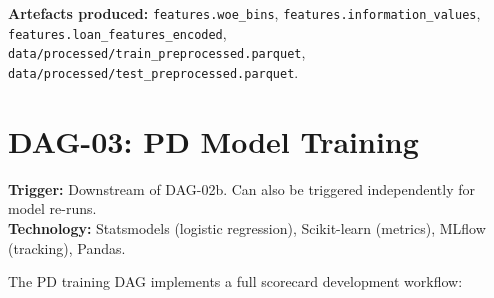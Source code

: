 \documentclass[12pt,a4paper]{report}
\begin{document}
\textbf{Artefacts produced:} \texttt{features.woe\_bins}, \texttt{features.information\_values}, \texttt{features.loan\_features\_encoded}, \texttt{data/processed/train\_preprocessed.parquet}, \texttt{data/processed/test\_preprocessed.parquet}.

\section{DAG-03: PD Model Training}

\textbf{Trigger:} Downstream of DAG-02b. Can also be triggered independently for model re-runs.\\
\textbf{Technology:} Statsmodels (logistic regression), Scikit-learn (metrics), MLflow (tracking), Pandas.

The PD training DAG implements a full scorecard development workflow:
\end{document}
